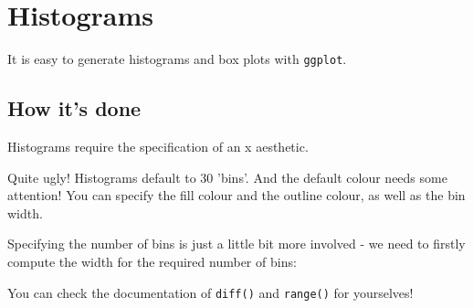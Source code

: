 \documentclass[titlepage]{book}\usepackage{knitr}
\begin{document}
\section{Histograms} 

It is easy to generate histograms and box plots with \texttt{ggplot}.

\subsection{How it's done}
Histograms require the specification of an x aesthetic.

\begin{knitrout}
\color{fgcolor}\begin{kframe}
\begin{alltt}
 \hlkwb{<-} \hlstd{(}  \hlstd{(} 
 \hlkwb{<-}  \hlopt{+} \hlstd{()}
\end{alltt}
\end{kframe}
\end{knitrout}
Quite ugly!  Histograms default to 30 'bins'. And the default colour needs some attention!
You can specify the fill colour and the outline colour, as well as the bin width.

\begin{knitrout}
\color{fgcolor}\begin{kframe}
\begin{alltt}
 \hlkwb{<-} \hlstd{(}  \hlstd{(} 
 \hlkwb{<-}  \hlopt{+} \hlstd{(} \hlstd{=} \hlstd{,}  \hlstd{=} \hlstd{,}  \hlstd{=} \hlstd{)}
\end{alltt}
\end{kframe}
\end{knitrout}
Specifying the number of bins is just a little bit more involved -  we need to firstly compute the width for the required number of bins:

\begin{knitrout}
\color{fgcolor}\begin{kframe}
\begin{alltt}
 \hlkwb{<-} \hlstd{(}\hlopt{$}\hlopt{/}
 \hlkwb{<-} \hlstd{(}  \hlstd{(} 
 \hlkwb{<-}  \hlopt{+} \hlstd{(}   \hlstd{=} \hlstd{,}  \hlstd{=} \hlstd{)}
\end{alltt}
\end{kframe}
\end{knitrout}
You can check the documentation of \texttt{diff()} and \texttt{range()} for yourselves!
\end{document}
